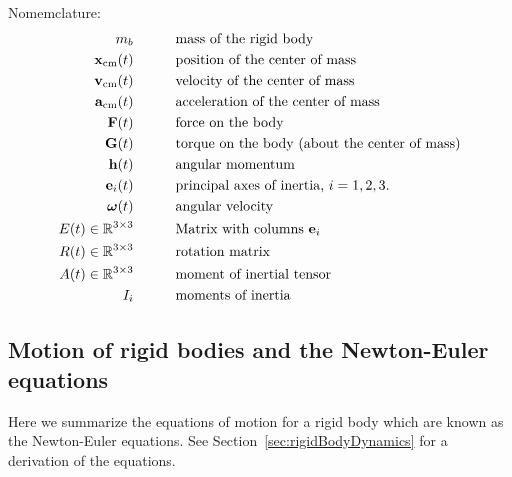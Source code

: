 Nomemclature:
\begin{alignat*}{3}
   m_{b}             &\qquad&& \text{mass of the rigid body}\\
   \mathbf{ x}_{\rm cm}(t)        &\qquad&& \text{position of the center of mass} \\
   \mathbf{ v}_{\rm cm}(t)        &\qquad&& \text{velocity of the center of mass} \\
   \mathbf{ a}_{\rm cm}(t)        &\qquad&& \text{acceleration of the center of mass} \\
  \mathbf{ F}(t)            &\qquad&& \text{force on the body} \\
  \mathbf{ G}(t)            &\qquad&& \text{torque on the body (about the center of mass)} \\
  \mathbf{ h}(t)            &\qquad&& \text{angular momentum} \\
  \mathbf{ e}_i(t)          &\qquad&& \text{principal axes of inertia, $i=1,2,3$.}\\
  \boldsymbol{\omega}(t)        &\qquad&& \text{angular velocity}\\
  E(t)\in {\mathbb R}^{3\times3}        &\qquad&& \text{Matrix with columns $\mathbf{ e}_i$}\\
  R(t)\in {\mathbb R}^{3\times3}        &\qquad&& \text{rotation matrix}\\
  A(t)\in {\mathbb R}^{3\times3}        &\qquad&& \text{moment of inertial tensor}\\
  I_i            &\qquad&& \text{moments of inertia}
\end{alignat*}


\subsection{Motion of rigid bodies and the Newton-Euler equations}

Here we summarize the equations of motion for a rigid body which are known
as the Newton-Euler equations. See Section~\ref{sec:rigidBodyDynamics} for a derivation of the equations.


